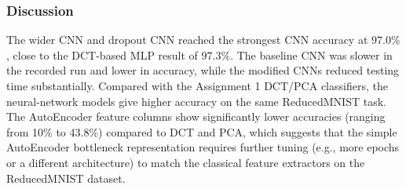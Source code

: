 \begin{table}[H]
    \centering
    \caption{Performance comparison across Assignment 1 classical methods, Problem 1 MLP, and Problem 2 CNN}
    \label{tab:prob2_results}
\end{table}

\subsubsection{Discussion}
The wider CNN and dropout CNN reached the strongest CNN accuracy at $97.0\%$, close to the DCT-based MLP result of $97.3\%$. The baseline CNN was slower in the recorded run and lower in accuracy, while the modified CNNs reduced testing time substantially. Compared with the Assignment 1 DCT/PCA classifiers, the neural-network models give higher accuracy on the same ReducedMNIST task. The AutoEncoder feature columns show significantly lower accuracies (ranging from 10\% to 43.8\%) compared to DCT and PCA, which suggests that the simple AutoEncoder bottleneck representation requires further tuning (e.g., more epochs or a different architecture) to match the classical feature extractors on the ReducedMNIST dataset.
